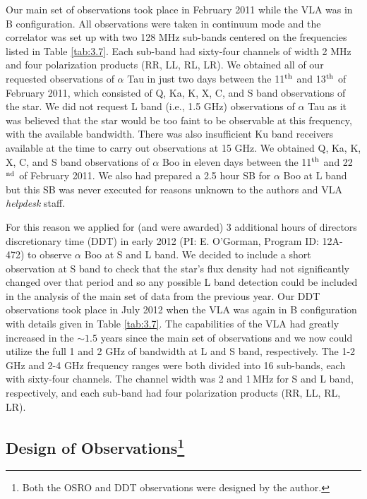 Our main set of observations took place in February 2011 while the VLA was in B configuration. All observations were taken in continuum mode and the correlator was set up with two 128 MHz sub-bands centered on the frequencies listed in Table \ref{tab:3.7}. Each sub-band had sixty-four channels of width 2 MHz and four polarization products (RR, LL, RL, LR). We obtained all of our requested observations of $\alpha$ Tau in just two days between the 11$^{\rm{th}}$ and 13$^{\rm{th}}$ of February 2011, which consisted of Q, Ka, K, X, C, and S band observations of the star. We did not request L band (i.e., 1.5 GHz) observations of $\alpha$ Tau as it was believed that the star would be too faint to be observable at this frequency, with the available bandwidth. There was also insufficient Ku band receivers available at the time to carry out observations at 15 GHz. We obtained Q, Ka, K, X, C, and S band observations of $\alpha$ Boo in eleven days between the 11$^{\rm{th}}$ and 22$^{\rm{nd}}$ of February 2011. We also had prepared a 2.5 hour SB for $\alpha$ Boo at L band but this SB was never executed for reasons unknown to the authors and VLA \textit{helpdesk} staff. 

For this reason we applied for (and were awarded) 3 additional hours of directors discretionary time (DDT) in early 2012 (PI: E. O'Gorman, Program ID: 12A-472) to observe $\alpha$ Boo at S and L band. We decided to include a short observation at S band to check that the star's flux density had not significantly changed over that period and so any possible L band detection could be included in the analysis of the main set of data from the previous year. Our DDT observations took place in July 2012 when the VLA was again in B configuration with details given in Table \ref{tab:3.7}. The capabilities of the VLA had greatly increased in the $\sim 1.5$ years since the main set of observations and we now could utilize the full 1 and 2 GHz of bandwidth at L and S band, respectively. The 1-2 GHz and 2-4 GHz frequency ranges were both divided into 16 sub-bands, each with sixty-four channels. The channel width was 2 and 1\,MHz for S and L band, respectively, and each sub-band had four polarization products (RR, LL, RL, LR).

\subsection[Design of Observations]{Design of Observations\footnote{Both the OSRO and DDT observations were designed by the author.}}
\label{sec:3.6.2}

